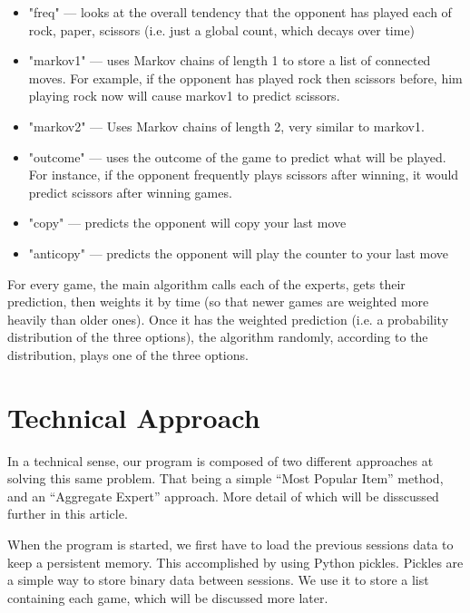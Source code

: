 \begin{itemize}
    \item "freq" --- looks at the overall tendency that the opponent has played
    each of rock, paper, scissors (i.e. just a global count, which decays over time)
    \item "markov1" --- uses Markov chains of length 1 to store a list of
    connected moves. For example, if the opponent has played rock then scissors
    before, him playing rock now will cause markov1 to predict scissors.
    \item "markov2" --- Uses Markov chains of length 2, very similar to markov1.
    \item "outcome" --- uses the outcome of the game to predict what will be
    played. For instance, if the opponent frequently plays scissors after
    winning, it would predict scissors after winning games.
    \item "copy" --- predicts the opponent will copy your last move
    \item "anticopy" --- predicts the opponent will play the counter to your last move
\end{itemize}

For every game, the main algorithm calls each of the experts, gets their
prediction, then weights it by time (so that newer games are weighted more
heavily than older ones). Once it has the weighted prediction (i.e. a
probability distribution of the three options), the algorithm randomly,
according to the distribution, plays one of the three options.



\section{Technical Approach}



In a technical sense, our program is composed of two different approaches at solving this
same problem. That being a simple ``Most Popular Item'' method, and an ``Aggregate Expert''
approach. More detail of which will be disscussed further in this article.

When the program is started, we first have to load the previous sessions data to
keep a persistent memory. This accomplished by using Python pickles. Pickles are
a simple way to store binary data between sessions. We use it to store a list
containing each game, which will be discussed more later.

